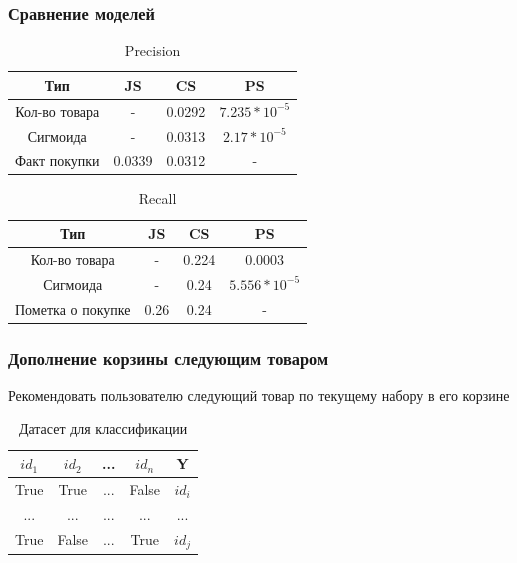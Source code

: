 \documentclass[10pt, unicode]{beamer}
\begin{document}
\begin{frame}
  \frametitle{Сравнение моделей}

  \begin{table}[H]
    \centering
    \begin{tabular} { | c | c | c | c | }
      \hline
      Тип & JS & CS & PS \\
      \hline
      Кол-во товара & - & 0.0292 & $7.235 * 10^{-5}$ \\
      \hline
      Сигмоида & - & 0.0313 & $2.17 * 10^{-5}$ \\
      \hline
      Факт покупки & 0.0339 & 0.0312 & - \\
      \hline
    \end{tabular}
    \caption{Precision}
  \end{table}

  \begin{table}[H]
    \centering
    \begin{tabular} { | c | c | c | c | }
      \hline
      Тип & JS & CS & PS \\
      \hline
      Кол-во товара & - & 0.224 & 0.0003\\
      \hline
      Сигмоида & - & 0.24 & $5.556 * 10^{-5}$ \\
      \hline
      Пометка о покупке & 0.26 & 0.24 & - \\
      \hline
    \end{tabular}
    \caption{Recall}
  \end{table}

\end{frame}

\begin{frame}
  \frametitle{Дополнение корзины следующим товаром}
  Рекомендовать пользователю следующий товар по текущему набору в его корзине
  \begin{table}[H]
    \centering
    \begin{tabular} { | c | c | c | c | c | }
    \hline
    $id_1$ & $id_2$ & ... & $id_n$ & Y \\
    \hline
    True  & True  & ... & False & $id_i$ \\
    \hline
    ...  & ...  & ... & ... & ... \\
    \hline
    True  & False  & ... & True & $id_j$ \\
    \hline
    \end{tabular}
    \caption{Датасет для классификации}
  \end{table}
\end{frame}
\end{document}
